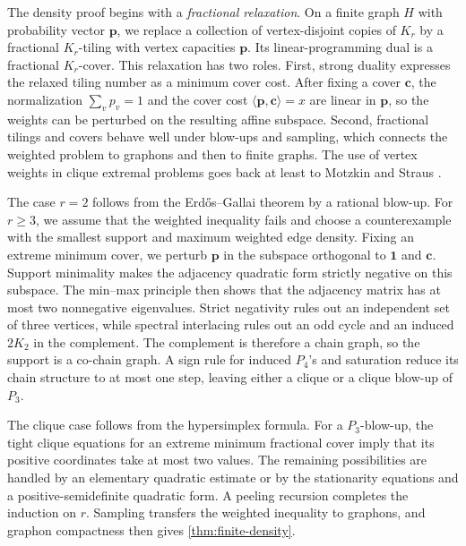 \documentclass[10pt]{article}
\numberwithin{equation}{section}
\newcommand{\one}{\mathbf 1}
\newcommand{\vct}[1]{\boldsymbol{#1}}
\begin{document}
The density proof begins with a \emph{fractional relaxation}.  On a finite graph $H$ with probability vector $\vct p$, we replace a collection of vertex-disjoint copies of $K_r$ by a fractional $K_r$-tiling with vertex capacities $\vct p$.  Its linear-programming dual is a fractional $K_r$-cover.  This relaxation has two roles.  First, strong duality expresses the relaxed tiling number as a minimum cover cost.  After fixing a cover $\vct c$, the normalization $\sum_vp_v=1$ and the cover cost $\langle\vct p,\vct c\rangle=x$ are linear in $\vct p$, so the weights can be perturbed on the resulting affine subspace.  Second, fractional tilings and covers behave well under blow-ups and sampling, which connects the weighted problem to graphons and then to finite graphs.  The use of vertex weights in clique extremal problems goes back at least to Motzkin and Straus \cite{MotzkinStraus65}.

The case $r=2$ follows from the Erd\H{o}s--Gallai theorem by a rational blow-up.  For $r\ge3$, we assume that the weighted inequality fails and choose a counterexample with the smallest support and maximum weighted edge density.  Fixing an extreme minimum cover, we perturb $\vct p$ in the subspace orthogonal to $\one$ and $\vct c$.  Support minimality makes the adjacency quadratic form strictly negative on this subspace.  The min--max principle then shows that the adjacency matrix has at most two nonnegative eigenvalues.  Strict negativity rules out an independent set of three vertices, while spectral interlacing rules out an odd cycle and an induced $2K_2$ in the complement.  The complement is therefore a chain graph, so the support is a co-chain graph.  A sign rule for induced $P_4$'s and saturation reduce its chain structure to at most one step, leaving either a clique or a clique blow-up of $P_3$.

The clique case follows from the hypersimplex formula.  For a $P_3$-blow-up, the tight clique equations for an extreme minimum fractional cover imply that its positive coordinates take at most two values.  The remaining possibilities are handled by an elementary quadratic estimate or by the stationarity equations and a positive-semidefinite quadratic form.  A peeling recursion completes the induction on $r$.  Sampling transfers the weighted inequality to graphons, and graphon compactness then gives \cref{thm:finite-density}.
\end{document}
